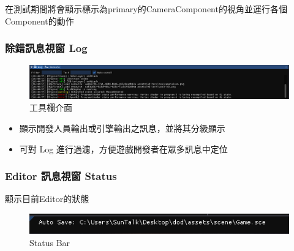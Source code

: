 在測試期間將會顯示標示為primary的CameraComponent的視角並運行各個Component的動作



\subsubsection{除錯訊息視窗 Log}

\begin{figure}[h]
    \begin{center}
    \includegraphics[width=\textwidth]{./resources/editor/logger.png}
    \end{center}
\caption{工具欄介面}
\end{figure}

\begin{itemize}
\item{顯示開發人員輸出或引擎輸出之訊息，並將其分級顯示}
\item{可對 Log 進行過濾，方便遊戲開發者在眾多訊息中定位}
\end{itemize}

\subsubsection{Editor 訊息視窗 Status}

顯示目前Editor的狀態

\begin{figure}[h]
    \begin{center}
        \includegraphics[width=\textwidth]{./resources/editor/statusbar.png}
    \end{center}
\caption{Status Bar}
\end{figure}


